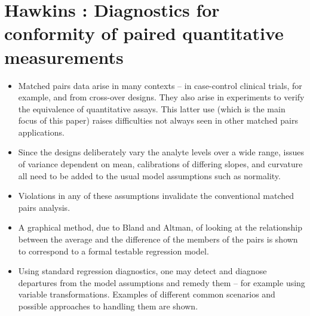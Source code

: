 \documentclass[12pt, a4paper]{report}
\theoremstyle{plain}
\theoremstyle{definition}
\theoremstyle{remark}
\begin{document}
%	
%	



\section{Hawkins : Diagnostics for conformity of paired quantitative measurements}

\begin{itemize}
	\item Matched pairs data arise in many contexts – in case-control clinical trials, for example, and from cross-over designs. They also arise in experiments to verify the equivalence of quantitative assays. This latter use (which is the main focus of this paper) raises difficulties not always seen in other matched pairs applications. 
	
	\item Since the designs deliberately vary the analyte levels over a wide range, issues of variance dependent on mean, calibrations of differing slopes, and curvature all need to be added to the usual model assumptions such as normality. 
	
	\item Violations in any of these assumptions invalidate the conventional matched pairs analysis. 
	
	\item A graphical method, due to Bland and Altman, of looking at the relationship between the average and the difference of the members of the pairs is shown to correspond to a formal testable regression model. 
	
	\item Using standard regression diagnostics, one may detect and diagnose departures from the model assumptions and remedy them – for example using variable transformations. Examples of different common scenarios and possible approaches to handling them are shown.
\end{itemize}

\end{document}
